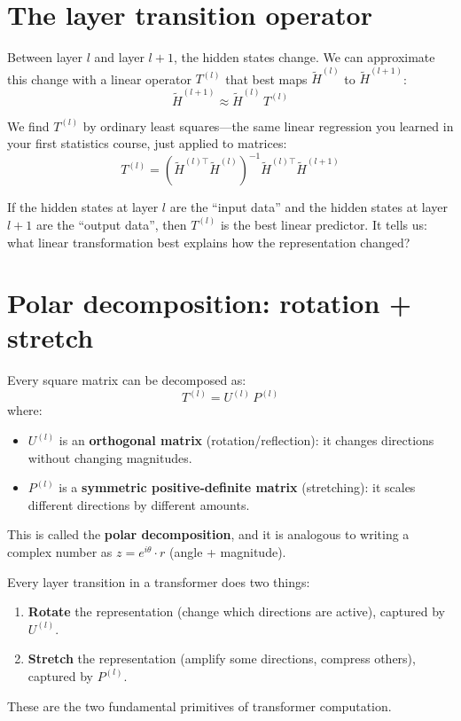 \documentclass[11pt, twoside, openright]{memoir}
\begin{document}
\section{The layer transition operator}

Between layer $l$ and layer $l+1$, the hidden states change. We can
approximate this change with a linear operator $T^{(l)}$ that best maps
$\widetilde{H}^{(l)}$ to $\widetilde{H}^{(l+1)}$:
\[
  \widetilde{H}^{(l+1)} \approx \widetilde{H}^{(l)} \, T^{(l)}
\]

We find $T^{(l)}$ by ordinary least squares---the same linear regression
you learned in your first statistics course, just applied to matrices:
\[
  T^{(l)} = \left(\widetilde{H}^{(l)\top}\widetilde{H}^{(l)}\right)^{-1}
  \widetilde{H}^{(l)\top}\widetilde{H}^{(l+1)}
\]

\begin{analogy}
If the hidden states at layer $l$ are the ``input data'' and the hidden
states at layer $l+1$ are the ``output data'', then $T^{(l)}$ is the
best linear predictor. It tells us: what linear transformation best
explains how the representation changed?
\end{analogy}

\section{Polar decomposition: rotation + stretch}

Every square matrix can be decomposed as:
\[
  T^{(l)} = U^{(l)} \, P^{(l)}
\]
where:
\begin{itemize}[nosep]
\item $U^{(l)}$ is an \textbf{orthogonal matrix} (rotation/reflection):
  it changes directions without changing magnitudes.
\item $P^{(l)}$ is a \textbf{symmetric positive-definite matrix}
  (stretching): it scales different directions by different amounts.
\end{itemize}

This is called the \textbf{polar decomposition}, and it is analogous to
writing a complex number as $z = e^{i\theta} \cdot r$ (angle + magnitude).

\begin{keyidea}
Every layer transition in a transformer does two things:
\begin{enumerate}[nosep]
\item \textbf{Rotate} the representation (change which directions are
  active), captured by $U^{(l)}$.
\item \textbf{Stretch} the representation (amplify some directions,
  compress others), captured by $P^{(l)}$.
\end{enumerate}
These are the two fundamental primitives of transformer computation.
\end{keyidea}
\end{document}
